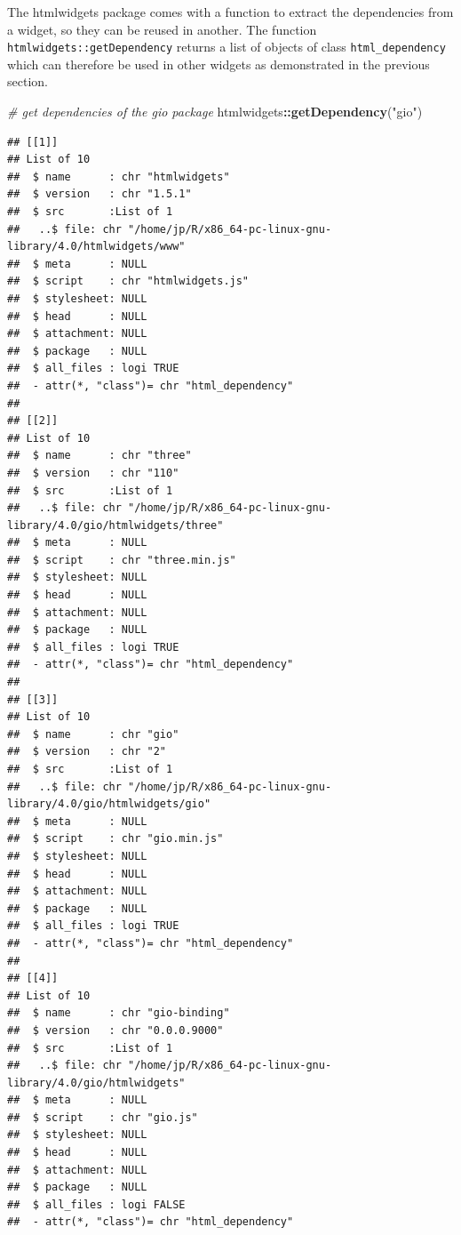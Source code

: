 \documentclass[
]{krantz}
\makeatletter
\newenvironment{Shaded}{\begin{snugshade}}{\end{snugshade}}
\newcommand{\CommentTok}[1]{\textcolor[rgb]{0.37,0.37,0.37}{\textit{#1}}}
\newcommand{\KeywordTok}[1]{\textcolor[rgb]{0.27,0.27,0.27}{\textbf{#1}}}
\newcommand{\NormalTok}[1]{#1}
\newcommand{\OperatorTok}[1]{\textcolor[rgb]{0.43,0.43,0.43}{\textbf{#1}}}
\newcommand{\StringTok}[1]{\textcolor[rgb]{0.5,0.5,0.5}{#1}}
\newenvironment{kframe}{%
\medskip{}
\setlength{\fboxsep}{.8em}
 \def\at@end@of@kframe{}%
 \ifinner\ifhmode%
  \def\at@end@of@kframe{\end{minipage}}%
  \begin{minipage}{\columnwidth}%
 \fi\fi%
 \def\FrameCommand##1{\hskip\@totalleftmargin \hskip-\fboxsep
 \colorbox{shadecolor}{##1}\hskip-\fboxsep
     \hskip-\linewidth \hskip-\@totalleftmargin \hskip\columnwidth}%
 \MakeFramed {\advance\hsize-\width
   \@totalleftmargin\z@ \linewidth\hsize
   \@setminipage}}%
 {\par\unskip\endMakeFramed%
 \at@end@of@kframe}
\renewenvironment{Shaded}{\begin{kframe}}{\end{kframe}}
\makeatother
\begin{document}
The htmlwidgets package comes with a function to extract the dependencies from a widget, so they can be reused in another. The function \texttt{htmlwidgets::getDependency} returns a list of objects of class \texttt{html\_dependency} which can therefore be used in other widgets as demonstrated in the previous section.

\begin{Shaded}
\begin{Highlighting}[]
\CommentTok{\# get dependencies of the gio package}
\NormalTok{htmlwidgets}\OperatorTok{::}\KeywordTok{getDependency}\NormalTok{(}\StringTok{"gio"}\NormalTok{)}
\end{Highlighting}
\end{Shaded}

\begin{verbatim}
## [[1]]
## List of 10
##  $ name      : chr "htmlwidgets"
##  $ version   : chr "1.5.1"
##  $ src       :List of 1
##   ..$ file: chr "/home/jp/R/x86_64-pc-linux-gnu-library/4.0/htmlwidgets/www"
##  $ meta      : NULL
##  $ script    : chr "htmlwidgets.js"
##  $ stylesheet: NULL
##  $ head      : NULL
##  $ attachment: NULL
##  $ package   : NULL
##  $ all_files : logi TRUE
##  - attr(*, "class")= chr "html_dependency"
## 
## [[2]]
## List of 10
##  $ name      : chr "three"
##  $ version   : chr "110"
##  $ src       :List of 1
##   ..$ file: chr "/home/jp/R/x86_64-pc-linux-gnu-library/4.0/gio/htmlwidgets/three"
##  $ meta      : NULL
##  $ script    : chr "three.min.js"
##  $ stylesheet: NULL
##  $ head      : NULL
##  $ attachment: NULL
##  $ package   : NULL
##  $ all_files : logi TRUE
##  - attr(*, "class")= chr "html_dependency"
## 
## [[3]]
## List of 10
##  $ name      : chr "gio"
##  $ version   : chr "2"
##  $ src       :List of 1
##   ..$ file: chr "/home/jp/R/x86_64-pc-linux-gnu-library/4.0/gio/htmlwidgets/gio"
##  $ meta      : NULL
##  $ script    : chr "gio.min.js"
##  $ stylesheet: NULL
##  $ head      : NULL
##  $ attachment: NULL
##  $ package   : NULL
##  $ all_files : logi TRUE
##  - attr(*, "class")= chr "html_dependency"
## 
## [[4]]
## List of 10
##  $ name      : chr "gio-binding"
##  $ version   : chr "0.0.0.9000"
##  $ src       :List of 1
##   ..$ file: chr "/home/jp/R/x86_64-pc-linux-gnu-library/4.0/gio/htmlwidgets"
##  $ meta      : NULL
##  $ script    : chr "gio.js"
##  $ stylesheet: NULL
##  $ head      : NULL
##  $ attachment: NULL
##  $ package   : NULL
##  $ all_files : logi FALSE
##  - attr(*, "class")= chr "html_dependency"
\end{verbatim}
\end{document}
